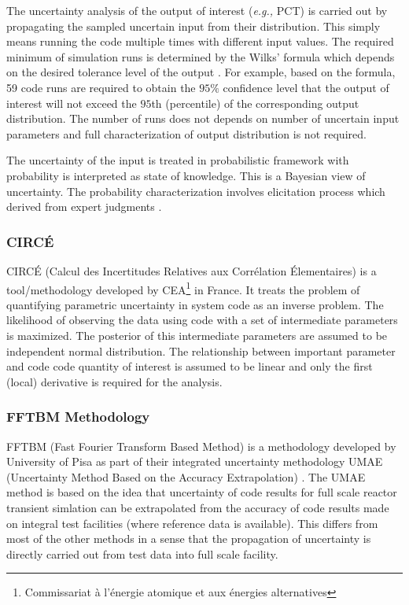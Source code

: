 \documentclass[11pt,titlepage]{article}
\begin{document}
The uncertainty analysis of the output of interest (\textit{e.g.,} PCT) is carried out by propagating the sampled uncertain input from their distribution. 
This simply means running the code multiple times with different input values. 
The required minimum of simulation runs is determined by the Wilks' formula \cite{Wilks1942} which depends on the desired tolerance level of the output \cite{Glaeser2008}. 
For example, based on the formula, 59 code runs are required to obtain the $95\%$ confidence level that the output of interest will not exceed the $95$th (percentile) of the corresponding output distribution.
The number of runs does not depends on number of uncertain input parameters and full characterization of output distribution is not required.

The uncertainty of the input is treated in probabilistic framework with probability is interpreted as state of knowledge. 
This is a Bayesian view of uncertainty. 
The probability characterization involves elicitation process which derived from expert judgments \cite{Glaeser1994}. 

\subsubsection{CIRCÉ}

CIRCÉ (Calcul des Incertitudes Relatives aux Corrélation Élementaires) is a tool/methodology developed by CEA\footnote{Commissariat à l'énergie atomique et aux énergies alternatives} in France. 
It treats the problem of quantifying parametric uncertainty in system code as an inverse problem. 
The likelihood of observing the data using code with a set of intermediate parameters is maximized. 
The posterior of this intermediate parameters are assumed to be independent normal distribution. 
The relationship between important parameter and code code quantity of interest is assumed to be linear and only the first (local) derivative is required for the analysis.

\subsubsection{FFTBM Methodology}

FFTBM (Fast Fourier Transform Based Method) is a methodology developed by University of Pisa as part of their integrated uncertainty methodology UMAE (Uncertainty Method Based on the Accuracy Extrapolation) \cite{Prosek2002,DAuria1998}. 
The UMAE method is based on the idea that uncertainty of code results for full scale reactor transient simlation can be extrapolated from the accuracy of code results made on integral test facilities (where reference data is available). 
This differs from most of the other methods in a sense that the propagation of uncertainty is directly carried out from test data into full scale facility.
\end{document}

